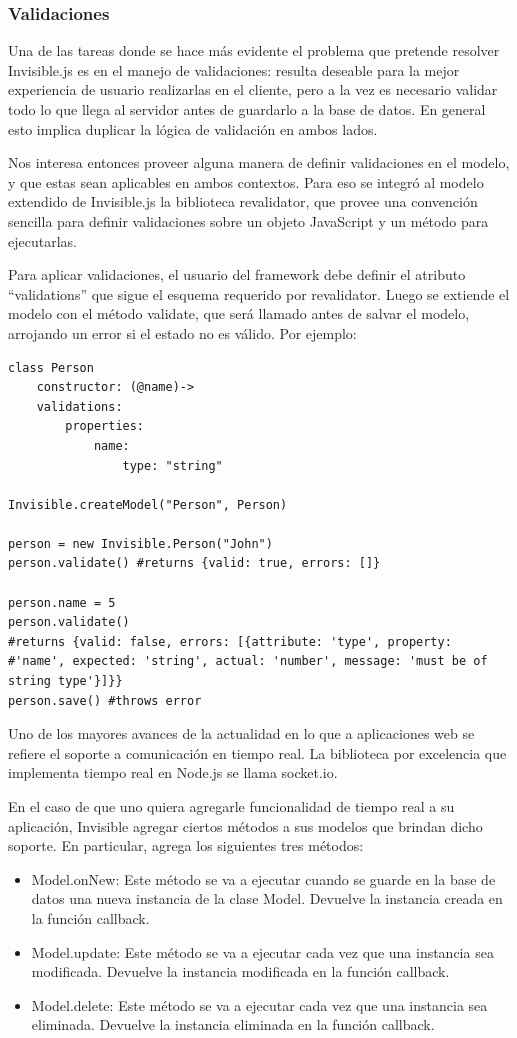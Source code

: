 \documentclass[doc,helv,longtable]{article}
\begin{document}
\subsubsection{Validaciones}
Una de las tareas donde se hace más evidente el problema que pretende resolver Invisible.js es en el manejo de validaciones: resulta deseable para la mejor experiencia de usuario realizarlas en el cliente, pero a la vez es necesario validar todo lo que llega al servidor antes de guardarlo a la base de datos. En general esto implica duplicar la lógica de validación en ambos lados.

Nos interesa entonces proveer alguna manera de definir validaciones en el modelo, y que estas sean aplicables en ambos contextos. Para eso se integró al modelo extendido de Invisible.js la biblioteca revalidator\cite{revalidator}, que provee una convención sencilla para definir validaciones sobre un objeto JavaScript y un método para ejecutarlas.

Para aplicar validaciones, el usuario del framework debe definir el atributo “validations” que sigue el esquema requerido por revalidator. Luego se extiende el modelo con el método validate, que será llamado antes de salvar el modelo, arrojando un error si el estado no es válido. Por ejemplo:

\begin{lstlisting}
class Person
    constructor: (@name)->
    validations: 
        properties:
            name:
                type: "string"

Invisible.createModel("Person", Person)

person = new Invisible.Person("John")
person.validate() #returns {valid: true, errors: []}

person.name = 5
person.validate() 
#returns {valid: false, errors: [{attribute: 'type', property: #'name', expected: 'string', actual: 'number', message: 'must be of string type'}]}}
person.save() #throws error
\end{lstlisting}

Uno de los mayores avances de la actualidad en lo que a aplicaciones web se refiere el soporte a comunicación en tiempo real. La biblioteca por excelencia que implementa tiempo real en Node.js se llama socket.io. 

En el caso de que uno quiera agregarle funcionalidad de tiempo real a su aplicación, Invisible agregar ciertos métodos a sus modelos que brindan dicho soporte. En particular, agrega los siguientes tres métodos:


\begin{itemize}
\item  Model.onNew: Este método se va a ejecutar cuando se guarde en la base de datos una nueva instancia de la clase Model. Devuelve la instancia creada en la función callback.
\item  Model.update: Este método se va a ejecutar cada vez que una instancia sea modificada. Devuelve la instancia modificada en la función callback.
\item  Model.delete: Este método se va a ejecutar cada vez que una instancia sea eliminada. Devuelve la instancia eliminada en la función callback.

\end{itemize}
\end{document}
